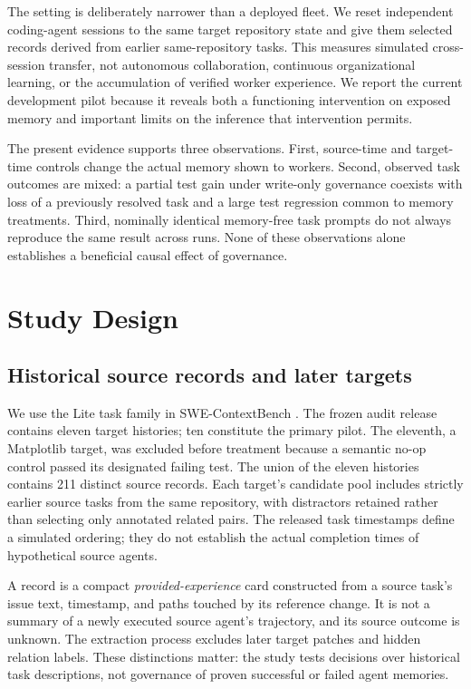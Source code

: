 \documentclass[sigconf,anonymous]{aamas}
\begin{document}
The setting is deliberately narrower than a deployed fleet. We reset independent coding-agent sessions to the same target repository state and give them selected records derived from earlier same-repository tasks. This measures simulated cross-session transfer, not autonomous collaboration, continuous organizational learning, or the accumulation of verified worker experience. We report the current development pilot because it reveals both a functioning intervention on exposed memory and important limits on the inference that intervention permits.

The present evidence supports three observations. First, source-time and target-time controls change the actual memory shown to workers. Second, observed task outcomes are mixed: a partial test gain under write-only governance coexists with loss of a previously resolved task and a large test regression common to memory treatments. Third, nominally identical memory-free task prompts do not always reproduce the same result across runs. None of these observations alone establishes a beneficial causal effect of governance.

\section{Study Design}
\subsection{Historical source records and later targets}
We use the Lite task family in SWE-ContextBench \cite{zhu2026swecontext}. The frozen audit release contains eleven target histories; ten constitute the primary pilot. The eleventh, a Matplotlib target, was excluded before treatment because a semantic no-op control passed its designated failing test. The union of the eleven histories contains 211 distinct source records. Each target's candidate pool includes strictly earlier source tasks from the same repository, with distractors retained rather than selecting only annotated related pairs. The released task timestamps define a simulated ordering; they do not establish the actual completion times of hypothetical source agents.

A record is a compact \emph{provided-experience} card constructed from a source task's issue text, timestamp, and paths touched by its reference change. It is not a summary of a newly executed source agent's trajectory, and its source outcome is unknown. The extraction process excludes later target patches and hidden relation labels. These distinctions matter: the study tests decisions over historical task descriptions, not governance of proven successful or failed agent memories.
\end{document}
